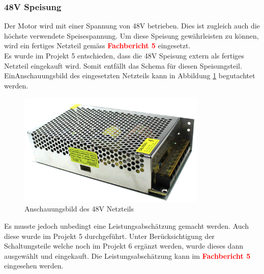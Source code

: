 \subsubsection{48V Speisung}
\label{subsubec:48V Speisung}


Der Motor wird mit einer Spannung von 48V betrieben. Dies ist zugleich auch die höchste verwendete Speisespannung. Um diese Speisung gewährleisten zu können, wird ein fertiges Netzteil gemäss  \textcolor{red}{\textbf{Fachbericht 5}} eingesetzt.\\

Es wurde im Projekt 5 entschieden, dass die 48V Speisung extern als fertiges Netzteil eingekauft wird. Somit entfällt das Schema für diesen Speisungsteil. EinAnschauungsbild des eingesetzten Netzteils kann in Abbildung \ref{fig:Netzteil_48V} begutachtet werden.\\

\begin{figure}[h!]
	\centering
	\includegraphics[width=0.8\textwidth]{graphics/Netzteil_48V.png}
	\caption{Anschauungsbild des 48V Netzteils}
	\label{fig:Netzteil_48V}
\end{figure} 

Es musste jedoch unbedingt eine Leistungsabschätzung gemacht werden. Auch diese wurde im Projekt 5 durchgeführt. Unter Berücksichtigung der Schaltungsteile welche noch im Projekt 6 ergänzt werden, wurde dieses dann ausgewählt und eingekauft. Die Leistungsabschätzung kann im \textcolor{red}{\textbf{Fachbericht 5}} eingesehen werden. 